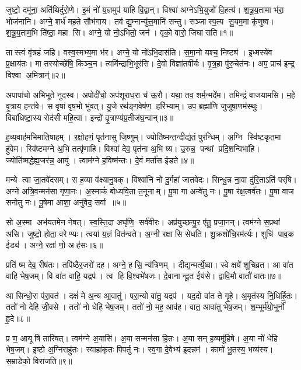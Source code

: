 जुष्टो॒ दमू॑ना॒ अति॑थिर्दुरो॒णे।
इ॒मं नो॑ य॒ज्ञमुप॑ याहि वि॒द्वान्।
विश्वा॑ अग्नेऽभि॒युजो॑ वि॒हत्य॑।
श॒त्रू॒य॒तामा भ॑रा॒ भोज॑नानि।
अग्ने॒ शर्ध॑ मह॒ते सौभ॑गाय।
तव॑ द्यु॒म्नान्यु॑त्त॒मानि॑ सन्तु।
सञ्जास्प॒त्य सु॒यम॒मा कृ॑णुष्व।
श॒त्रू॒य॒ताम॒भि ति॑ष्ठा॒ महा सि।
अग्ने॒ यो नो॒ऽभितो॒ जन॑।
वृको॒ वारो॒ जिघासति॥१॥

तास्त्वं वृ॑त्रहं जहि।
वस्व॒स्मभ्य॒मा भ॑र।
अग्ने॒ यो नो॑ऽभि॒दास॑ति।
स॒मा॒नो यश्च॒ निष्ट्य॑।
इ॒ध्मस्ये॑व प्र॒क्षाय॑तः।
मा तस्योच्छे॑षि॒ किञ्च॒न।
त्वमि॑न्द्राभि॒भूर॑सि।
दे॒वो विज्ञा॑तवीर्यः।
वृ॒त्र॒हा पु॑रु॒चेत॑नः।
अप॒ प्राच॑ इन्द्र॒ विश्वा अ॒मित्रान्॑॥२॥

अपापा॑चो अभिभूते नुदस्व।
अपोदी॑चो॒ अप॑शूराध॒रा च॑ ऊ॒रौ।
यथा॒ तव॒ शर्म॒न्मदे॑म।
तमिन्द्रं॑ वाजयामसि।
म॒हे वृ॒त्राय॒ हन्त॑वे।
स वृषा॑ वृष॒भो भु॑वत्।
यु॒जे रथ॑ङ्ग॒वेष॑ण॒ हरि॑भ्याम्।
उप॒ ब्रह्मा॑णि जुजुषा॒णम॑स्थुः।
विबा॑धिष्टा॒स्य रोद॑सी महि॒त्वा।
इन्द्रो॑ वृ॒त्राण्य॑प्र॒तीज॑घ॒न्वान्॥३॥

ह॒व्य॒वाह॑मभिमाति॒षाहम्।
र॒क्षो॒हणं॒ पृत॑नासु जि॒ष्णुम्।
ज्योति॑ष्मन्त॒न्दीद्य॑तं॒ पुर॑न्धिम्।
अ॒ग्नि स्वि॑ष्ट॒कृत॒मा हु॑वेम।
स्वि॑ष्टमग्ने अ॒भि तत्पृ॑णाहि।
विश्वा॑ देव॒ पृत॑ना अ॒भि ष्य।
उ॒रुन्न॒ पन्थां प्रदि॒शन्विभा॑हि।
ज्योति॑ष्मद्धेह्य॒जर॑न्न॒ आयु॑।
त्वाम॑ग्ने ह॒विष्म॑न्तः।
दे॒वं मर्ता॑स ईडते॥४॥

मन्ये त्वा जा॒तवे॑दसम्।
स ह॒व्या व॑क्ष्यानु॒षक्।
विश्वा॑नि नो दु॒र्गहा॑ जातवेदः।
सिन्धु॒न्न ना॒वा दु॑रि॒ताऽति॑ पर्‌षि।
अग्ने॑ अत्रि॒वन्मन॑सा गृणा॒नः।
अ॒स्माकं॑ बोध्यवि॒ता त॒नूनाम्।
पू॒षा गा अन्वे॑तु नः।
पू॒षा र॑क्ष॒त्वर्व॑तः।
पू॒षा वाज सनोतु नः।
पू॒षेमा आशा॒ अनु॑वेद॒ सर्वा॥५॥

सो अ॒स्मा अभ॑यतमेन नेषत्।
स्व॒स्ति॒दा अघृ॑णि॒ सर्व॑वीरः।
अप्र॑युच्छन्पु॒र ए॑तु॒ प्रजा॒नन्।
त्वम॑ग्ने स॒प्रथा॑ असि।
जुष्टो॒ होता॒ वरेण्यः।
त्वया॑ य॒ज्ञं वित॑न्वते।
अ॒ग्नी रक्षासि सेधति।
शु॒क्रशो॑चि॒रम॑र्त्यः।
शुचि॑ पाव॒क ईड्य॑।
अग्ने॒ रक्षा॑ णो॒ अह॑सः॥६॥

प्रति॑ ष्म देव॒ रीष॑तः।
तपि॑ष्ठैर॒जरो॑ दह।
अग्ने॒ हसि॒ न्य॑त्रिणम्।
दीद्य॒न्मर्त्ये॒ष्वा।
स्वे क्षये॑ शुचिव्रत।
आ वा॑त वाहि भेष॒जम्।
वि वा॑त वाहि॒ यद्रप॑।
त्व हि वि॒श्वभे॑षजः।
दे॒वानान्दू॒त ईय॑से।
द्वावि॒मौ वातौ॑ वातः॥७॥

आ सिन्धो॒रा प॑रा॒वत॑।
दक्षं॑ मे अ॒न्य आ॒वातु॑।
परा॒न्यो वा॑तु॒ यद्रप॑।
यद॒दो वा॑त ते गृ॒हे।
अ॒मृत॑स्य नि॒धिर्\mbox{}हि॒तः।
ततो॑ नो देहि जी॒वसे।
ततो॑ नो धेहि भेष॒जम्।
ततो॑ नो॒ मह॒ आव॑ह।
वात॒ आवा॑तु भेष॒जम्।
श॒म्भूर्म॑यो॒भूर्नो॑ हृ॒दे॥८॥

प्र ण॒ आयूषि तारिषत्।
त्वम॑ग्ने अ॒यासि॑।
अ॒या सन्मन॑सा हि॒तः।
अ॒या सन् ह॒व्यमू॑हिषे।
अ॒या नो॑ धेहि भेष॒जम्।
इ॒ष्टो अ॒ग्निराहु॑तः।
स्वाहा॑कृतः पिपर्तु नः।
स्व॒गा दे॒वेभ्य॑ इ॒दन्नम॑।
कामो॑ भू॒तस्य॒ भव्य॑स्य।
स॒म्राडेको॒ विरा॑जति॥९॥

